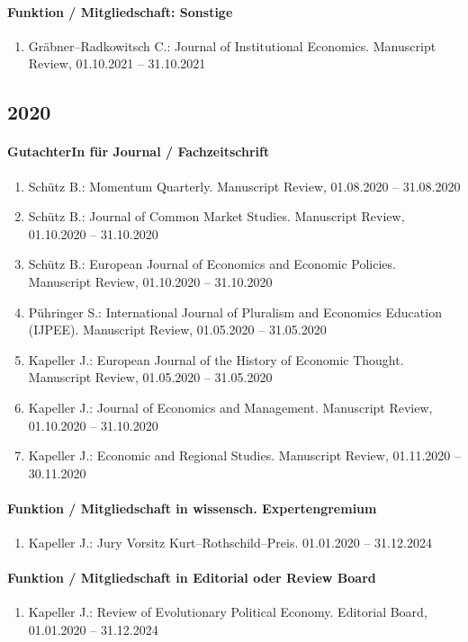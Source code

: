 \paragraph{Funktion / Mitgliedschaft: Sonstige}
\begin{enumerate}[leftmargin=*, labelsep=0.5cm]
\item Gräbner--Radkowitsch C.: Journal of Institutional Economics. Manuscript Review, 01.10.2021 -- 31.10.2021
\end{enumerate}\subsection*{2020}\paragraph{GutachterIn für Journal / Fachzeitschrift}
\begin{enumerate}[leftmargin=*, labelsep=0.5cm]
\item Schütz B.: Momentum Quarterly. Manuscript Review, 01.08.2020 -- 31.08.2020
\item Schütz B.: Journal of Common Market Studies. Manuscript Review, 01.10.2020 -- 31.10.2020
\item Schütz B.: European Journal of Economics and Economic Policies. Manuscript Review, 01.10.2020 -- 31.10.2020
\item Pühringer S.: International Journal of Pluralism and Economics Education (IJPEE). Manuscript Review, 01.05.2020 -- 31.05.2020
\item Kapeller J.: European Journal of the History of Economic Thought. Manuscript Review, 01.05.2020 -- 31.05.2020
\item Kapeller J.: Journal of Economics and Management. Manuscript Review, 01.10.2020 -- 31.10.2020
\item Kapeller J.: Economic and Regional Studies. Manuscript Review, 01.11.2020 -- 30.11.2020
\end{enumerate}
\paragraph{Funktion / Mitgliedschaft in wissensch. Expertengremium}
\begin{enumerate}[leftmargin=*, labelsep=0.5cm]
\item Kapeller J.: Jury Vorsitz Kurt--Rothschild--Preis. 01.01.2020 -- 31.12.2024
\end{enumerate}
\paragraph{Funktion / Mitgliedschaft in Editorial oder Review Board}
\begin{enumerate}[leftmargin=*, labelsep=0.5cm]
\item Kapeller J.: Review of Evolutionary Political Economy. Editorial Board, 01.01.2020 -- 31.12.2024
\end{enumerate}
